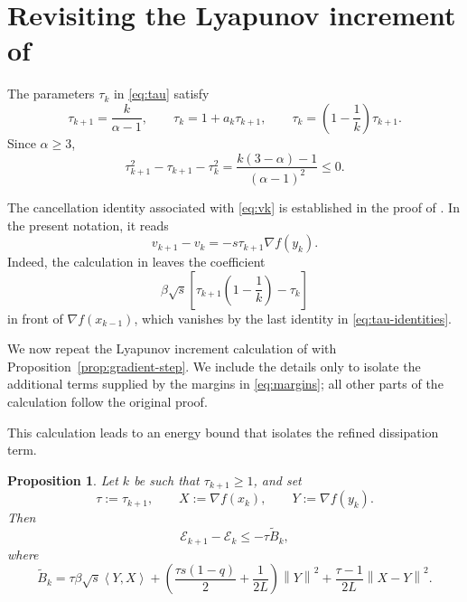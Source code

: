 \documentclass[11pt]{article}
\theoremstyle{plain}
\newtheorem{proposition}[theorem]{Proposition}
\theoremstyle{definition}
\newcommand{\norm}[1]{\left\lVert #1\right\rVert}
\newcommand{\inner}[2]{\left\langle #1,#2\right\rangle}
\begin{document}
\section{Revisiting the Lyapunov increment of \texorpdfstring{\cite{AFCR2022}}{[1]}}
\label{sec:lyapunov}
The parameters $\tau_k$ in \eqref{eq:tau} satisfy
\begin{equation}
\label{eq:tau-identities}
\tau_{k+1}=\frac{k}{\alpha-1},
\qquad
\tau_k=1+a_k\tau_{k+1},
\qquad
\tau_k=\left(1-\frac1k\right)\tau_{k+1}.
\end{equation}
Since $\alpha\geq3$,
\begin{equation}
\label{eq:tau-inequality}
\tau_{k+1}^2-\tau_{k+1}-\tau_k^2
=\frac{k(3-\alpha)-1}{(\alpha-1)^2}\leq0.
\end{equation}

The cancellation identity associated with \eqref{eq:vk} is established in the proof of \cite[Theorem~6]{AFCR2022}. In the present
notation, it reads
\begin{equation}
\label{eq:v-cancellation}
v_{k+1}-v_k=-s\tau_{k+1}\nabla f(y_k).
\end{equation}
Indeed, the calculation in \cite{AFCR2022} leaves the coefficient
$$
\beta\sqrt{s}
\left[\tau_{k+1}\left(1-\frac1k\right)-\tau_k\right]
$$
in front of $\nabla f(x_{k-1})$, which vanishes by the last identity in
\eqref{eq:tau-identities}.

We now repeat the Lyapunov increment calculation of \cite[Theorem~6]{AFCR2022} with
Proposition~\ref{prop:gradient-step}. We include the details only to isolate the additional terms supplied by the margins in \eqref{eq:margins}; all other parts of the calculation follow the original proof.

This calculation leads to an energy bound that isolates the refined dissipation term.

\begin{proposition}
\label{prop:energy-increment}
Let $k$ be such that $\tau_{k+1}\geq1$, and set
$$
\tau:=\tau_{k+1},
\qquad
X:=\nabla f(x_k),
\qquad
Y:=\nabla f(y_k).
$$
Then
\begin{equation}
\label{eq:energy-increment}
\mathcal E_{k+1}-\mathcal E_k\leq-\tau\widetilde B_k,
\end{equation}
where
\begin{equation}
\label{eq:B-unexpanded}
\widetilde B_k
=\tau\beta\sqrt{s}\inner{Y}{X}
+\left(\frac{\tau s(1-q)}2+\frac{1}{2L}\right)\norm{Y}^2
+\frac{\tau-1}{2L}\norm{X-Y}^2.
\end{equation}
\end{proposition}
\end{document}
